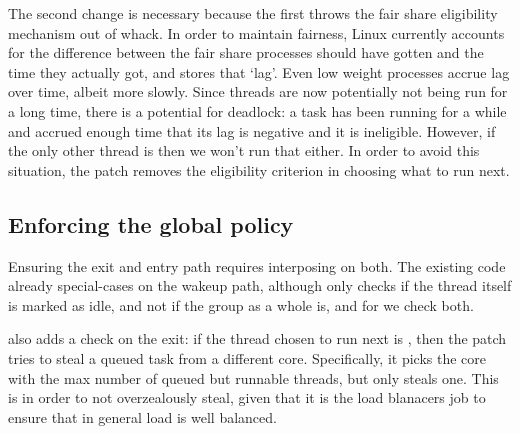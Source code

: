 The second change is necessary because the first throws the fair share
eligibility mechanism out of whack. In order to maintain fairness, Linux
currently accounts for the difference between the fair share processes should
have gotten and the time they actually got, and stores that `lag'. Even low
weight processes accrue lag over time, albeit more slowly. Since \schedbe{}
threads are now potentially not being run for a long time, there is a potential
for deadlock: a \schednormal{} task has been running for a while and accrued
enough time that its lag is negative and it is ineligible. However, if the only
other thread is \schedbe{} then we won't run that either. In order to avoid this
situation, the patch removes the eligibility criterion in choosing what to run
next.


\subsection{Enforcing the global policy}

Ensuring the exit and entry path requires interposing on both. The existing code
already special-cases on the wakeup path, although only checks if the thread
itself is marked as idle, and not if the group as a whole is, and for \schedbe{}
we check both.

\schedbe{} also adds a check on the exit: if the thread chosen to run next is
\schedbe{}, then the patch tries to steal a queued \schednormal{} task from a
different core. Specifically, it picks the core with the max number of queued
but runnable \schednormal{} threads, but only steals one. This is in order to
not overzealously steal, given that it is the load blanacers job to ensure that
in general load is well balanced.
